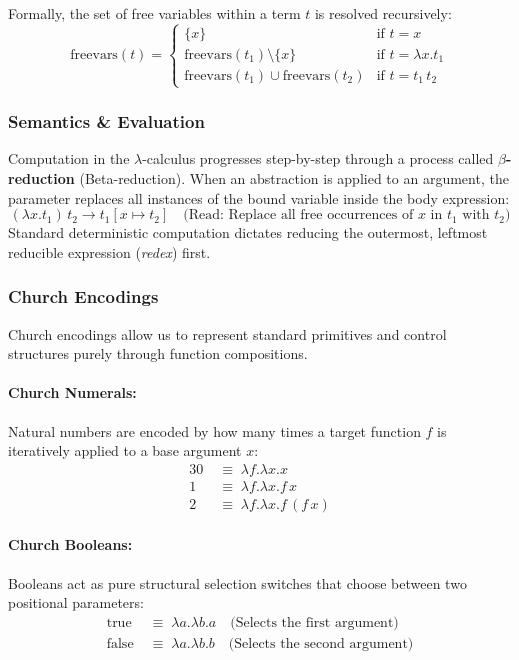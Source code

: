 \documentclass{article}
\begin{document}
Formally, the set of free variables within a term $t$ is resolved recursively:
\[
\text{freevars}(t) = \begin{cases}
  \{x\} & \text{if } t = x \\
  \text{freevars}(t_1) \setminus \{x\} & \text{if } t = \lambda x . t_1 \\
  \text{freevars}(t_1) \cup \text{freevars}(t_2) & \text{if } t = t_1 \, t_2
\end{cases}
\]

\subsubsection{Semantics \& Evaluation}
Computation in the $\lambda$-calculus progresses step-by-step through a process called \textbf{$\beta$-reduction} (Beta-reduction). When an abstraction is applied to an argument, the parameter replaces all instances of the bound variable inside the body expression:
\[
(\lambda x . t_1) \, t_2 \to t_1[x \mapsto t_2] \quad \text{(Read: Replace all free occurrences of } x \text{ in } t_1 \text{ with } t_2\text{)}
\]
Standard deterministic computation dictates reducing the outermost, leftmost reducible expression (\textit{redex}) first.

\subsubsection{Church Encodings}
Church encodings allow us to represent standard primitives and control structures purely through function compositions.

\paragraph{Church Numerals:} Natural numbers are encoded by how many times a target function $f$ is iteratively applied to a base argument $x$:
\begin{alignat*}{3}
  0 & \;\equiv\; \lambda f . \lambda x . x \\
  1 & \;\equiv\; \lambda f . \lambda x . f \, x \\
  2 & \;\equiv\; \lambda f . \lambda x . f \, (f \, x)
\end{alignat*}

\paragraph{Church Booleans:} Booleans act as pure structural selection switches that choose between two positional parameters:
\begin{align*}
  \text{true}  & \;\equiv\; \lambda a . \lambda b . a \quad \text{(Selects the first argument)} \\
  \text{false} & \;\equiv\; \lambda a . \lambda b . b \quad \text{(Selects the second argument)}
\end{align*}
\end{document}
